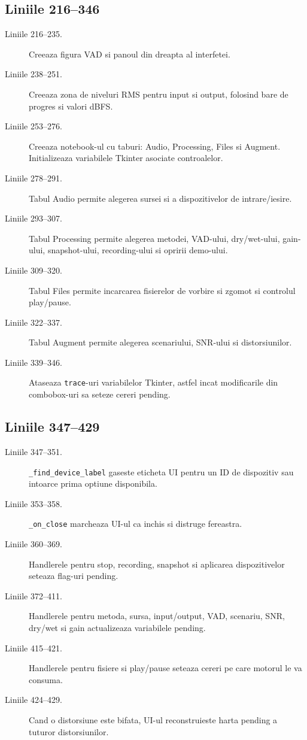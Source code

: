 \documentclass[12pt,a4paper]{report}
\newcommand{\chunk}[3]{\subsection*{Liniile #2--#3}}
\begin{document}
\chunk{../src/tools/realtime/ui.py}{216}{346}

\begin{description}
    \item[Liniile 216--235.] Creeaza figura VAD si panoul din dreapta al interfetei.
    \item[Liniile 238--251.] Creeaza zona de niveluri RMS pentru input si output,
    folosind bare de progres si valori dBFS.
    \item[Liniile 253--276.] Creeaza notebook-ul cu taburi: Audio, Processing,
    Files si Augment. Initializeaza variabilele Tkinter asociate controalelor.
    \item[Liniile 278--291.] Tabul Audio permite alegerea sursei si a dispozitivelor
    de intrare/iesire.
    \item[Liniile 293--307.] Tabul Processing permite alegerea metodei, VAD-ului,
    dry/wet-ului, gain-ului, snapshot-ului, recording-ului si opririi demo-ului.
    \item[Liniile 309--320.] Tabul Files permite incarcarea fisierelor de vorbire
    si zgomot si controlul play/pause.
    \item[Liniile 322--337.] Tabul Augment permite alegerea scenariului, SNR-ului
    si distorsiunilor.
    \item[Liniile 339--346.] Ataseaza \texttt{trace}-uri variabilelor Tkinter, astfel
    incat modificarile din combobox-uri sa seteze cereri pending.
\end{description}

\chunk{../src/tools/realtime/ui.py}{347}{429}

\begin{description}
    \item[Liniile 347--351.] \texttt{\_find\_device\_label} gaseste eticheta UI
    pentru un ID de dispozitiv sau intoarce prima optiune disponibila.
    \item[Liniile 353--358.] \texttt{\_on\_close} marcheaza UI-ul ca inchis si distruge
    fereastra.
    \item[Liniile 360--369.] Handlerele pentru stop, recording, snapshot si aplicarea
    dispozitivelor seteaza flag-uri pending.
    \item[Liniile 372--411.] Handlerele pentru metoda, sursa, input/output, VAD,
    scenariu, SNR, dry/wet si gain actualizeaza variabilele pending.
    \item[Liniile 415--421.] Handlerele pentru fisiere si play/pause seteaza cereri
    pe care motorul le va consuma.
    \item[Liniile 424--429.] Cand o distorsiune este bifata, UI-ul reconstruieste
    harta pending a tuturor distorsiunilor.
\end{description}
\end{document}
